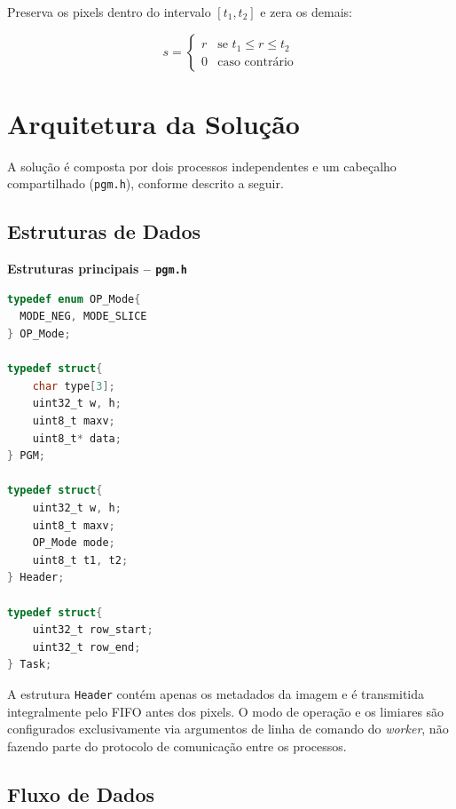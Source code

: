 \documentclass[12 pt]{abntex2}
\begin{document}
Preserva os pixels dentro do intervalo $[t_1, t_2]$ e zera os demais:
 
\begin{equation}
  s = \begin{cases}
    r & \text{se } t_1 \leq r \leq t_2 \\
    0 & \text{caso contrário}
  \end{cases}
\end{equation}

\section{Arquitetura da Solução}
 
A solução é composta por dois processos independentes e um cabeçalho
compartilhado (\texttt{pgm.h}), conforme descrito a seguir.
 
\subsection{Estruturas de Dados}
 
\textbf{Estruturas principais -- \texttt{pgm.h}}
\begin{lstlisting}[language=C]
typedef enum OP_Mode{
  MODE_NEG, MODE_SLICE
} OP_Mode;

typedef struct{
    char type[3];
    uint32_t w, h; 
    uint8_t maxv; 
    uint8_t* data;
} PGM; 

typedef struct{
    uint32_t w, h;
    uint8_t maxv;
    OP_Mode mode; 
    uint8_t t1, t2; 
} Header;

typedef struct{ 
    uint32_t row_start; 
    uint32_t row_end; 
} Task;
\end{lstlisting}

A estrutura \texttt{Header} contém apenas os metadados da imagem e é
transmitida integralmente pelo FIFO antes dos pixels. O modo de operação e
os limiares são configurados exclusivamente via argumentos de linha de
comando do \textit{worker}, não fazendo parte do protocolo de comunicação
entre os processos.
 
\subsection{Fluxo de Dados}
 
\end{document}

